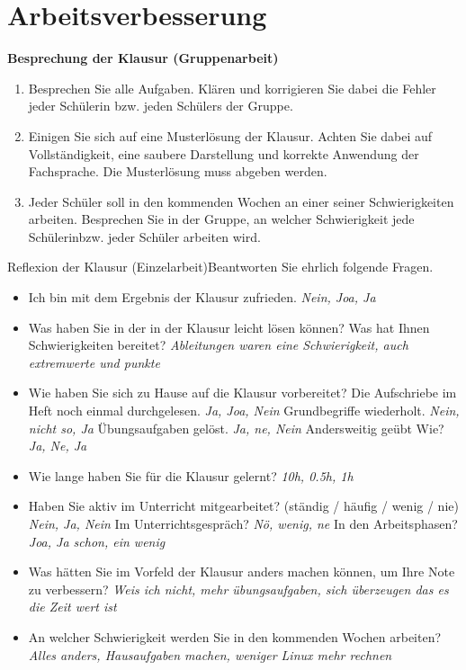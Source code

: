 \documentclass{report}
\begin{document}
\section{Arbeitsverbesserung}

\textbf{Besprechung der Klausur (Gruppenarbeit)}

\begin{enumerate}
  \item Besprechen Sie alle Aufgaben. Klären und korrigieren Sie dabei die
    Fehler jeder Schülerin bzw. jeden Schülers der Gruppe.
  \item Einigen Sie sich auf eine Musterlösung der Klausur. Achten Sie dabei
    auf Vollständigkeit, eine saubere Darstellung und korrekte Anwendung der
    Fachsprache. Die Musterlösung muss abgeben werden.
  \item Jeder Schüler soll in den kommenden Wochen an einer seiner
    Schwierigkeiten arbeiten. Besprechen Sie in der Gruppe, an welcher
    Schwierigkeit jede Schülerinbzw. jeder Schüler arbeiten wird.
\end{enumerate}

Reflexion der Klausur (Einzelarbeit)Beantworten Sie ehrlich folgende Fragen.

\begin{itemize}
  \item Ich bin mit dem Ergebnis der Klausur zufrieden. 
    \subitem \textit{Nein, Joa, Ja}

  \item Was haben Sie in der in der Klausur leicht lösen können? Was hat Ihnen
    Schwierigkeiten bereitet?
    \subitem \textit{Ableitungen waren eine Schwierigkeit, auch extremwerte und punkte}

  \item Wie haben Sie sich zu Hause auf die Klausur vorbereitet?
    \subitem Die Aufschriebe im Heft noch einmal durchgelesen. \textit{Ja, Joa, Nein}
    \subitem Grundbegriffe wiederholt. \textit{Nein, nicht so, Ja}
    \subitem Übungsaufgaben gelöst. \textit{Ja, ne, Nein}
    \subitem Andersweitig ge\"ubt Wie? \textit{Ja, Ne, Ja}

  \item Wie lange haben Sie für die Klausur gelernt? \textit{10h, 0.5h, 1h}

  \item Haben Sie aktiv im Unterricht mitgearbeitet? (ständig / häufig / wenig / nie) \textit{Nein, Ja, Nein}
    \subitem Im Unterrichtsgespräch? \textit{N\"o, wenig, ne}
    \subitem In den Arbeitsphasen? \textit{Joa, Ja schon, ein wenig}

  \item Was hätten Sie im Vorfeld der Klausur anders machen können, um Ihre Note zu verbessern?
    \subitem \textit{Weis ich nicht, mehr \"ubungsaufgaben, sich \"uberzeugen das es die Zeit wert ist}

  \item An welcher Schwierigkeit werden Sie in den kommenden Wochen arbeiten?
    \subitem \textit{Alles anders, Hausaufgaben machen, weniger Linux mehr rechnen}
\end{itemize}
\end{document}
